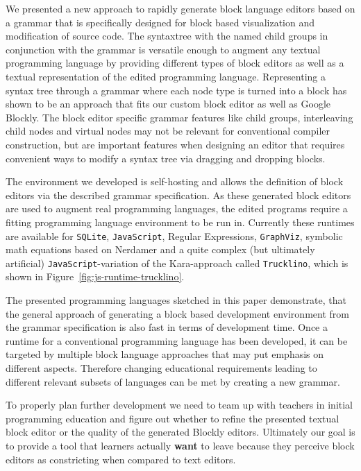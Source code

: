\documentclass[sigconf,natbib=false]{acmart}
\begin{document}
We presented a new approach to rapidly generate block language editors based on a grammar that is specifically designed for block based visualization and modification of source code. The syntaxtree with the named child groups in conjunction with the grammar is versatile enough to augment any textual programming language by providing different types of block editors as well as a textual representation of the edited programming language. Representing a syntax tree through a grammar where each node type is turned into a block has shown to be an approach that fits our custom block editor as well as Google Blockly. The block editor specific grammar features like child groups, interleaving child nodes and virtual nodes may not be relevant for conventional compiler construction, but are important features when designing an editor that requires convenient ways to modify a syntax tree via dragging and dropping blocks.

The environment we developed is self-hosting and allows the definition of block editors via the described grammar specification. As these generated block editors are used to augment real programming languages, the edited programs require a fitting programming language environment to be run in. Currently these runtimes are available for \texttt{SQLite}, \texttt{Java\-Script}, Regular Expressions, \texttt{Graph\-Viz}, symbolic math equations based on Nerdamer and a quite complex (but ultimately artificial) \texttt{Java\-Script}-variation of the Kara-approach called \texttt{Trucklino}\cite{popp_konzeption_2019}, which is shown in Figure~\ref{fig:js-runtime-trucklino}.

The presented programming languages sketched in this paper demonstrate, that the general approach of generating a block based development environment from the grammar specification is also fast in terms of development time. Once a runtime for a conventional programming language has been developed, it can be targeted by multiple block language approaches that may put emphasis on different aspects. Therefore changing educational requirements leading to different relevant subsets of languages can be met by creating a new grammar.

To properly plan further development  we need to team up with teachers in initial programming education and figure out whether to refine the presented textual block editor or the quality of the generated Blockly editors. Ultimately our goal is to provide a tool that learners actually \textbf{want} to leave because they perceive block editors as constricting when compared to text editors.
\printbibliography
\end{document}
